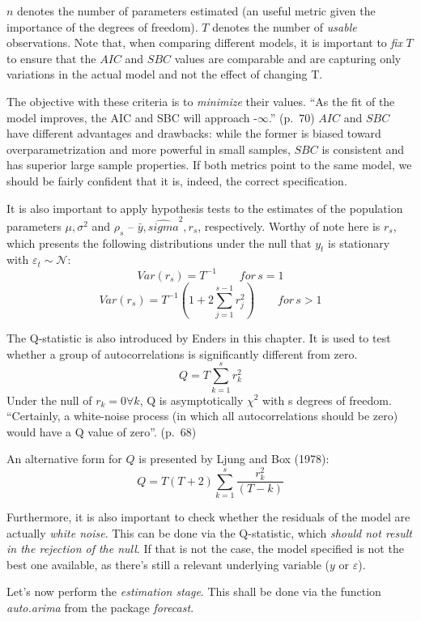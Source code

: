 \documentclass[11pt, a4paper]{report}
\theoremstyle{plain}
\theoremstyle{plain}
\theoremstyle{remark}
\begin{document}
\(n\) denotes the number of parameters estimated (an useful metric given
the importance of the degrees of freedom). \(T\) denotes the number of
\emph{usable} observations. Note that, when comparing different models,
it is important to \emph{fix} \(T\) to ensure that the \(AIC\) and
\(SBC\) values are comparable and are capturing only variations in the
actual model and not the effect of changing T.

The objective with these criteria is to \emph{minimize} their values.
``As the fit of the model improves, the AIC and SBC will approach
-\(\infty\).'' (p.~70) \(AIC\) and \(SBC\) have different advantages and
drawbacks: while the former is biased toward overparametrization and
more powerful in small samples, \(SBC\) is consistent and has superior
large sample properties. If both metrics point to the same model, we
should be fairly confident that it is, indeed, the correct
specification.

It is also important to apply hypothesis tests to the estimates of the
population parameters \(\mu, \sigma^2\) and \(\rho_s\) --
\(\bar{y}, \hat{sigma}^2, r_s\), respectively. Worthy of note here is
\(r_s\), which presents the following distributions under the null that
\(y_t\) is stationary with \(\varepsilon_t \sim \mathcal{N}\):
\[ Var(r_s) = T^{-1} \hspace{2em} for \, s = 1\]
\[ Var(r_s) = T^{-1}(1 + 2\sum_{j=1}^{s-1} r_j^2) \hspace{2em} for \, s > 1\]

The Q-statistic is also introduced by Enders in this chapter. It is used
to test whether a group of autocorrelations is significantly different
from zero. \[Q = T\sum_{k=1}^s r_k^2\] Under the null of
\(r_k = 0 \forall k\), Q is asymptotically \(\chi^2\) with s degrees of
freedom. ``Certainly, a white-noise process (in which all
autocorrelations should be zero) would have a Q value of zero''. (p.~68)

An alternative form for \(Q\) is presented by Ljung and Box (1978):
\[ Q = T(T+2) \sum_{k=1}^s \dfrac{r_k^2}{(T-k)} \]

Furthermore, it is also important to check whether the residuals of the
model are actually \emph{white noise}. This can be done via the
Q-statistic, which \emph{should not result in the rejection of the
	null}. If that is not the case, the model specified is not the best one
available, as there's still a relevant underlying variable (\(y\) or
\(\varepsilon\)).

Let's now perform the \emph{estimation stage}. This shall be done via
the function \emph{auto.arima} from the package \emph{forecast}.
\end{document}
